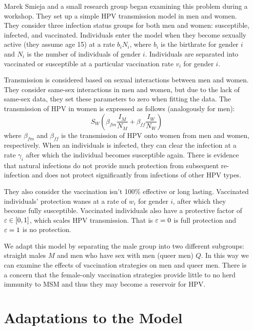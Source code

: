 \documentclass[12pt]{article}
\begin{document}
Marek Smieja and a small research group began examining this problem during a workshop.  They set up a simple HPV transmission model in men and women.  They consider three infection status groups for both men and women: susceptible, infected, and vaccinated.  Individuals enter the model when they become sexually active (they assume age 15) at a rate $b_iN_i$, where $b_i$ is the birthrate for gender $i$ and $N_i$ is the number of individuals of gender $i$.  Individuals are separated into vaccinated or susceptible at a particular vaccination rate $v_i$ for gender $i$.  

Transmission is considered based on sexual interactions between men and women.  They consider same-sex interactions in men and women, but due to the lack of same-sex data, they set these parameters to zero when fitting the data.  The transmission of HPV in women is expressed as follows (analogously for men):
\begin{equation}
S_{W}\left(\beta_{fm}\frac{I_M}{N_M} + \beta_{ff}\frac{I_W}{N_W}\right)
\end{equation}
where $\beta_{fm}$ and $\beta_{ff}$ is the transmission of HPV onto women from men and women, respectively.  When an individuals is infected, they can clear the infection at a rate $\gamma_i$ after which the individual becomes susceptible again.  There is evidence that natural infections do not provide much protection from subsequent re-infection and does not protect significantly from infections of other HPV types.  

They also consider the vaccination isn't 100\% effective or long lasting. Vaccinated individuals' protection wanes at a rate of $w_i$ for gender $i$, after which they become fully susceptible.  Vaccinated individuals also have a protective factor of $\varepsilon\in[0,1]$, which scales HPV transmission.  That is $\varepsilon=0$ is full protection and $\varepsilon=1$ is no protection.  

We adapt this model by separating the male group into two different subgroups: straight males $M$ and men who have sex with men (queer men) $Q$. In this way we can examine the effects of vaccination strategies on men and queer men.  There is a concern that the female-only vaccination strategies provide little to no herd immunity to MSM and thus they may become a reservoir for HPV. 

\section*{Adaptations to the Model}
\end{document}
